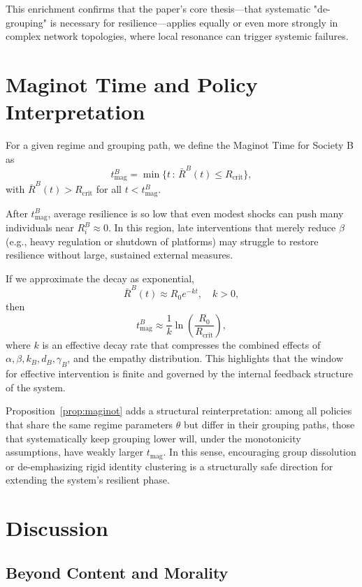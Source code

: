 \documentclass[11pt]{article}
\theoremstyle{plain}
\begin{document}
This enrichment confirms that the paper's core thesis---that systematic "de-grouping" is necessary for resilience---applies equally or even more strongly in complex network topologies, where local resonance can trigger systemic failures.

\section{Maginot Time and Policy Interpretation}
\label{sec:maginot}

For a given regime and grouping path, we define the Maginot Time for Society B as
\[
t_{\text{mag}}^B = \min\{ t \,:\, \bar{R}^B(t) \le R_{\text{crit}}\},
\]
with $\bar{R}^B(t) > R_{\text{crit}}$ for all $t < t_{\text{mag}}^B$.

After $t_{\text{mag}}^B$, average resilience is so low that even modest shocks can push many individuals near $R_i^B \approx 0$.
In this region, late interventions that merely reduce $\beta$ (e.g., heavy regulation or shutdown of platforms) may struggle to restore resilience without large, sustained external measures.

If we approximate the decay as exponential,
\[
\bar{R}^B(t) \approx R_0 e^{-kt}, \quad k>0,
\]
then
\begin{equation}
t_{\text{mag}}^B \approx \frac{1}{k} \ln\left(\frac{R_0}{R_{\text{crit}}}\right),
\end{equation}
where $k$ is an effective decay rate that compresses the combined effects of $\alpha, \beta, k_B, d_B, \gamma_B$, and the empathy distribution.
This highlights that the window for effective intervention is finite and governed by the internal feedback structure of the system.

Proposition~\ref{prop:maginot} adds a structural reinterpretation: among all policies that share the same regime parameters $\theta$ but differ in their grouping paths, those that systematically keep grouping lower will, under the monotonicity assumptions, have weakly larger $t_{\text{mag}}$.
In this sense, encouraging group dissolution or de-emphasizing rigid identity clustering is a structurally safe direction for extending the system's resilient phase.

\section{Discussion}

\subsection{Beyond Content and Morality}
\end{document}
